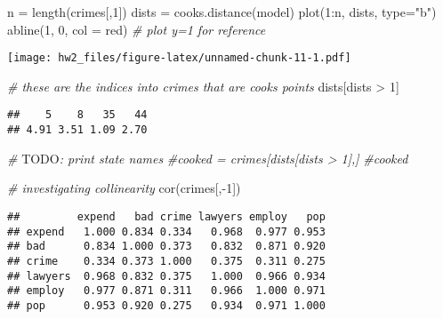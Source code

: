 \documentclass[
  11pt,
]{article}
\newenvironment{Shaded}{\begin{snugshade}}{\end{snugshade}}
\newcommand{\AlertTok}[1]{\textcolor[rgb]{0.94,0.16,0.16}{#1}}
\newcommand{\AttributeTok}[1]{\textcolor[rgb]{0.77,0.63,0.00}{#1}}
\newcommand{\CommentTok}[1]{\textcolor[rgb]{0.56,0.35,0.01}{\textit{#1}}}
\newcommand{\DecValTok}[1]{\textcolor[rgb]{0.00,0.00,0.81}{#1}}
\newcommand{\FunctionTok}[1]{\textcolor[rgb]{0.00,0.00,0.00}{#1}}
\newcommand{\NormalTok}[1]{#1}
\newcommand{\OtherTok}[1]{\textcolor[rgb]{0.56,0.35,0.01}{#1}}
\newcommand{\SpecialCharTok}[1]{\textcolor[rgb]{0.00,0.00,0.00}{#1}}
\newcommand{\StringTok}[1]{\textcolor[rgb]{0.31,0.60,0.02}{#1}}
\begin{document}
\begin{Shaded}
\begin{Highlighting}[]
\NormalTok{n }\OtherTok{=} \FunctionTok{length}\NormalTok{(crimes[,}\DecValTok{1}\NormalTok{])}
\NormalTok{dists }\OtherTok{=} \FunctionTok{cooks.distance}\NormalTok{(model)}
\FunctionTok{plot}\NormalTok{(}\DecValTok{1}\SpecialCharTok{:}\NormalTok{n, dists, }\AttributeTok{type=}\StringTok{"b"}\NormalTok{)}
\FunctionTok{abline}\NormalTok{(}\DecValTok{1}\NormalTok{, }\DecValTok{0}\NormalTok{, }\AttributeTok{col =} \StringTok{\textquotesingle{}red\textquotesingle{}}\NormalTok{) }\CommentTok{\# plot y=1 for reference}
\end{Highlighting}
\end{Shaded}

\texttt{[image: hw2\_files/figure-latex/unnamed-chunk-11-1.pdf]}

\begin{Shaded}
\begin{Highlighting}[]
\CommentTok{\# these are the indices into crimes that are cook\textquotesingle{}s points}
\NormalTok{dists[dists }\SpecialCharTok{\textgreater{}} \DecValTok{1}\NormalTok{]}
\end{Highlighting}
\end{Shaded}

\begin{verbatim}
##    5    8   35   44 
## 4.91 3.51 1.09 2.70
\end{verbatim}

\begin{Shaded}
\begin{Highlighting}[]
\CommentTok{\# }\AlertTok{TODO}\CommentTok{: print state names}
\CommentTok{\#cooked = crimes[dists[dists \textgreater{} 1],]}
\CommentTok{\#cooked}

\CommentTok{\# investigating collinearity}
\FunctionTok{cor}\NormalTok{(crimes[,}\SpecialCharTok{{-}}\DecValTok{1}\NormalTok{])}
\end{Highlighting}
\end{Shaded}

\begin{verbatim}
##         expend   bad crime lawyers employ   pop
## expend   1.000 0.834 0.334   0.968  0.977 0.953
## bad      0.834 1.000 0.373   0.832  0.871 0.920
## crime    0.334 0.373 1.000   0.375  0.311 0.275
## lawyers  0.968 0.832 0.375   1.000  0.966 0.934
## employ   0.977 0.871 0.311   0.966  1.000 0.971
## pop      0.953 0.920 0.275   0.934  0.971 1.000
\end{verbatim}
\end{document}
